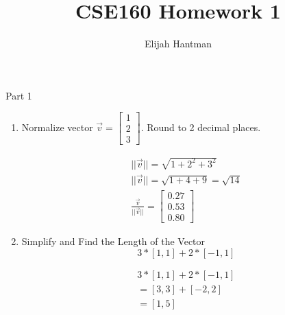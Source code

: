 \documentclass{article}
\title{CSE160 Homework 1}
\author{Elijah Hantman}
\begin{document}
    \maketitle

    {\large Part 1}
    \begin{enumerate}
        \item Normalize vector $\vec{v} = \begin{bmatrix}
                1\\
                2\\
                3
            \end{bmatrix} $. Round to 2 decimal places.

            \begin{mdframed}
                \begin{gather}
                    ||\vec{v}|| = \sqrt{1 + 2^2 + 3^2}\\
                    ||\vec{v}|| = \sqrt{1 + 4 + 9} = \sqrt{14}\\
                    \frac{\vec{v}}{||\vec{v}||} = \begin{bmatrix}
                        0.27\\
                        0.53\\
                        0.80
                    \end{bmatrix}
                \end{gather}
            \end{mdframed}
        \item Simplify and Find the Length of the Vector
            \begin{displaymath}
                3 * [1,1] + 2 * [-1, 1]
            \end{displaymath}
            \begin{mdframed}
                \begin{gather}
                    3 * [1,1] + 2 * [-1, 1]\\
                    = [3, 3] + [-2, 2]\\
                    = [1, 5]
                \end{gather}


\end{mdframed}
\end{enumerate}
\end{document}
